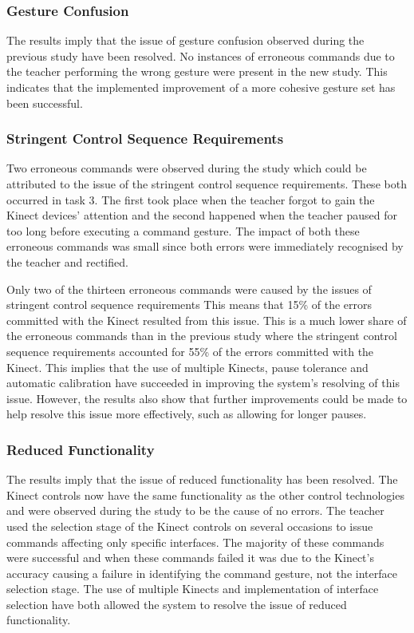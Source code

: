 \documentclass[manuscript, review, screen]{acmart}
\begin{document}
\subsubsection{Gesture Confusion}

The results imply that the issue of gesture confusion observed during the previous study have been resolved.
No instances of erroneous commands due to the teacher performing the wrong gesture were present in the new study.
This indicates that the implemented improvement of a more cohesive gesture set has been successful.

\subsubsection{Stringent Control Sequence Requirements}

Two erroneous commands were observed during the study which could be attributed to the issue of the stringent control sequence requirements.
These both occurred in task 3.
The first took place when the teacher forgot to gain the Kinect devices' attention and the second happened when the teacher paused for too long before executing a command gesture.
The impact of both these erroneous commands was small since both errors were immediately recognised by the teacher and rectified.

Only two of the thirteen erroneous commands were caused by the issues of stringent control sequence requirements
This means that 15\% of the errors committed with the Kinect resulted from this issue.
This is a much lower share of the erroneous commands than in the previous study where the stringent control sequence requirements accounted for 55\% of the errors committed with the Kinect.
This implies that the use of multiple Kinects, pause tolerance and automatic calibration have succeeded in improving the system's resolving of this issue.
However, the results also show that further improvements could be made to help resolve this issue more effectively, such as allowing for longer pauses.

\subsubsection{Reduced Functionality}
 
The results imply that the issue of reduced functionality has been resolved.
The Kinect controls now have the same functionality as the other control technologies and were observed during the study to be the cause of no errors.
The teacher used the selection stage of the Kinect controls on several occasions to issue commands affecting only specific interfaces.
The majority of these commands were successful and when these commands failed it was due to the Kinect's accuracy causing a failure in identifying the command gesture, not the interface selection stage.
The use of multiple Kinects and implementation of interface selection have both allowed the system to resolve the issue of reduced functionality.
\end{document}
